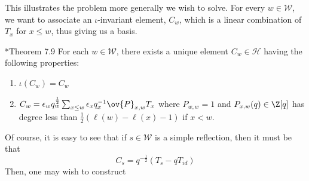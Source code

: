 \documentclass[11pt,leqno,oneside]{amsart}
\numberwithin{thm}{section}
\renewcommand{\W}{\mathcal{W}}
\renewcommand{\H}{\mathcal{H}} %
\begin{document}
 This illustrates the problem more generally we wish to solve. For
 every \(w \in \W\), we want to associate an \(\iota\)-invariant
 element, \(C_w\), which is a linear combination of \(T_x\) for \(x
 \leq w\), thus giving us a basis.
\begin{thm}
  \cite{humphreys}*{Theorem 7.9} For each \(w \in \W\), there exists a
  unique element \(C_w \in \H\) having the following properties:
  \begin{enumerate}
  \item \(\iota(C_w) = C_w\)
  \item \(C_w = \epsilon_w q_w^{\frac{1}{2}} \sum_{x \leq w} \epsilon_x
    q_x^{-1} \ov{P}_{x,w} T_x\) where \(P_{w,w} = 1\) and \(P_{x,w}(q)
    \in \Z[q]\) has degree less than
    \(\frac{1}{2}(\ell(w)-\ell(x)-1)\) if \(x < w\).
  \end{enumerate}
\end{thm}
Of course, it is easy to see that if \(s \in \W\) is a simple
reflection, then it must be that \[
  C_s = q^{-\frac{1}{2}}(T_s-qT_{id})
\]
Then, one may wish to construct 
\begin{example}
  
\end{example}
\begin{bibdiv}
  \begin{biblist}
  \end{biblist}
\end{bibdiv}
\end{document}
